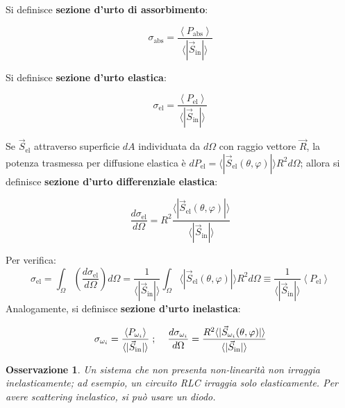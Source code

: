 \documentclass[10pt, a4paper]{scrartcl}
\numberwithin{equation}{subsection}
\theoremstyle{style1}
\newtheorem{osservazione}{Osservazione}[section]
\newenvironment{boxenv}[1][]{
    \begin{eqbox}[#1]
    }{
   \end{eqbox}
}
\begin{document}
\noindent Si definisce \textbf{sezione d'urto di assorbimento}:
\begin{boxenv}[]
\begin{equation}
	\sigma _\text{abs}= \frac{\left\langle P_\text{abs} \right\rangle}{\langle|\vec{S}_\text{in}|\rangle}
\end{equation}
\end{boxenv}
\noindent Si definisce \textbf{sezione d'urto elastica}:
\begin{boxenv}[]
\begin{equation}
	\sigma _\text{el} = \frac{\left\langle P_\text{el} \right\rangle}{\langle|\vec{S}_\text{in}|\rangle}
\end{equation}
\end{boxenv}
\noindent Se $\vec{S}_\text{el}$ attraverso superficie $dA$ individuata da $d\Omega $ con raggio vettore $\vec{R}$, la potenza trasmessa per diffusione elastica \`e $dP_\text{el}=\langle|\vec{S}_\text{el}(\theta ,\varphi )|\rangle R^2 d\Omega $; allora si definisce \textbf{sezione d'urto differenziale elastica}:
\begin{boxenv}[]
\begin{equation}
	\frac{d \sigma _\text{el}}{d \Omega}  = R^2 \frac{\langle |\vec{S}_\text{el}(\theta ,\varphi )|\rangle}{\langle|\vec{S}_\text{in}|\rangle}
\end{equation}
\end{boxenv}
\noindent Per verifica:
\[
\sigma _\text{el} = \int_{\Omega } \left(\frac{d \sigma _\text{el}}{d \Omega } \right) d\Omega = \frac{1}{\langle|\vec{S}_\text{in}|\rangle} \int_{\Omega }\langle|\vec{S}_\text{el}(\theta ,\varphi )|\rangle R^2 d\Omega \equiv \frac{1}{\langle|\vec{S}_\text{in}|\rangle} \left\langle P_\text{el} \right\rangle
\] 
Analogamente, si definisce \textbf{sezione d'urto inelastica}:
\begin{boxenv}[]
\begin{equation}
	\sigma _{\omega_i} = \frac{\left\langle P_{\omega_i}  \right\rangle}{\langle|\vec{S}_\text{in}|\rangle} \hspace{.1cm} ; \hspace{.4cm} \frac{d \sigma _{\omega_i} }{d \Omega }  = \frac{R^2 \langle|\vec{S}_{\omega_i} (\theta ,\varphi )|\rangle}{\langle|\vec{S}_\text{in}|\rangle}
\end{equation}
\end{boxenv}
\begin{osservazione}
	Un sistema che non presenta non-linearit\`a non irraggia inelasticamente; ad esempio, un circuito RLC irraggia solo elasticamente. Per avere scattering inelastico, si pu\`o usare un diodo.
\end{osservazione}
\end{document}

